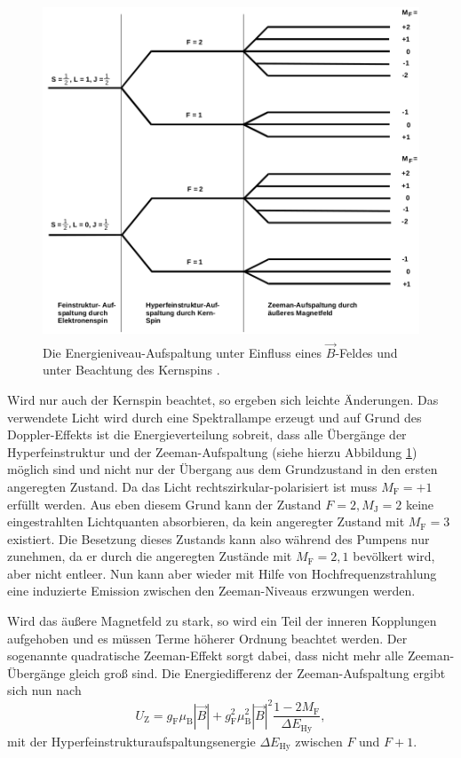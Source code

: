 \begin{figure}
  \centering
  \includegraphics[height=10cm]{content/pictures/Energieniveaus2.png}
  \caption{Die Energieniveau-Aufspaltung unter Einfluss eines $\vec{B}$-Feldes und unter Beachtung des Kernspins \cite{anleitung}.}
  \label{fig:aufspaltung2}
\end{figure}
Wird nur auch der Kernspin beachtet, so ergeben sich leichte Änderungen. Das verwendete Licht wird durch eine Spektrallampe erzeugt und 
auf Grund des Doppler-Effekts ist die Energieverteilung sobreit, dass alle Übergänge der 
Hyperfeinstruktur und der Zeeman-Aufspaltung (siehe hierzu Abbildung \ref{fig:aufspaltung2}) möglich sind und nicht nur der Übergang aus
dem Grundzustand in den ersten angeregten Zustand. Da das Licht rechtszirkular-polarisiert ist
muss $M_\text{F} = +1$ erfüllt werden. Aus eben diesem Grund kann der Zustand $F = 2, M_\text{J} = 2$ keine
eingestrahlten Lichtquanten absorbieren, da kein angeregter Zustand mit $M_\text{F} = 3$ existiert. Die Besetzung dieses Zustands
kann also während des Pumpens nur zunehmen, da er durch die angeregten Zustände mit $M_\text{F} = 2, 1$ bevölkert wird, aber nicht entleer.
Nun kann aber wieder mit Hilfe von Hochfrequenzstrahlung eine induzierte Emission zwischen den Zeeman-Niveaus erzwungen werden.

Wird das äußere Magnetfeld zu stark, so wird ein Teil der inneren Kopplungen aufgehoben und 
es müssen Terme höherer Ordnung beachtet werden. Der sogenannte quadratische Zeeman-Effekt sorgt dabei, dass nicht mehr alle 
Zeeman-Übergänge gleich groß sind. Die Energiedifferenz der Zeeman-Aufspaltung ergibt sich nun nach
\begin{equation}
  \label{eqn:zeemanquadrat}
  U_\text{Z} = g_\text{F} \mu_\text{B} |\vec{B}| + g_\text{F}^2 \mu_\text{B}^2 |\vec{B}|^2 \frac{1-2 M_\text{F}}{\Delta E_\text{Hy}},
\end{equation}
mit der Hyperfeinstrukturaufspaltungsenergie $\Delta E_\text{Hy}$ zwischen $F$ und $F+1$.

\FloatBarrier


